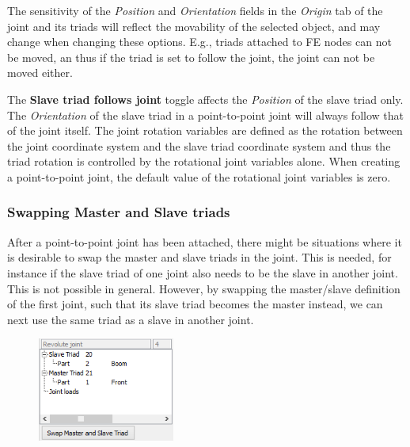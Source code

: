 The sensitivity of the {\sl Position} and {\sl Orientation} fields in
the {\sl Origin} tab of the joint and its triads will reflect the
movability of the selected object, and may change when changing these
options. E.g., triads attached to FE nodes can not be moved, an thus if
the triad is set to follow the joint, the joint can not be moved either.


The \textbf{Slave triad follows joint} toggle affects the
{\sl Position} of the slave triad only. The {\sl Orientation} of the
slave triad in a point-to-point joint will always follow that of the
joint itself. The joint rotation variables are defined as the rotation
between the joint coordinate system and the slave triad coordinate
system and thus the triad rotation is controlled by the rotational joint
variables alone. When creating a point-to-point joint, the default value
of the rotational joint variables is zero.


\subsubsection{Swapping Master and Slave triads}

After a point-to-point joint has been attached, there might be
situations where it is desirable to swap the master and slave triads in
the joint. This is needed, for instance if the slave triad of one joint
also needs to be the slave in another joint. This is not possible in
general. However, by swapping the master/slave definition of the first
joint, such that its slave triad becomes the master instead, we can next
use the same triad as a slave in another joint.

\clearpage
\begin{figure}
  \center
  \includegraphics[width=0.4\textwidth]{Figures/4-swapMasterSlave}
\end{figure}

